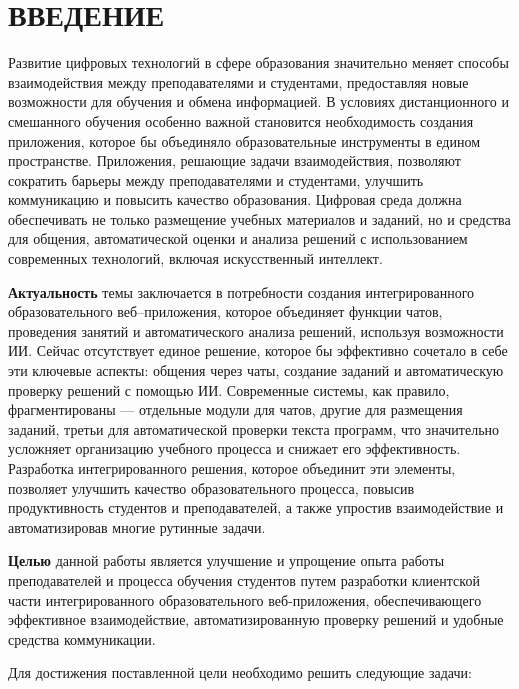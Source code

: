 \newpage
{}
\section*{ВВЕДЕНИЕ}

Развитие цифровых технологий в сфере образования значительно меняет способы взаимодействия между преподавателями и студентами, предоставляя новые возможности для обучения и обмена информацией. В условиях дистанционного и смешанного обучения особенно важной становится необходимость создания приложения, которое бы объединяло образовательные инструменты в едином пространстве. Приложения, решающие задачи взаимодействия, позволяют сократить барьеры между преподавателями и студентами, улучшить коммуникацию и повысить качество образования. Цифровая среда должна обеспечивать не только размещение учебных материалов и заданий, но и средства для общения, автоматической оценки и анализа решений с использованием современных технологий, включая искусственный интеллект.

\textbf{Актуальность} темы заключается в потребности создания интегрированного образовательного веб–приложения, которое объединяет функции чатов, проведения занятий и автоматического анализа решений, используя возможности ИИ. Сейчас отсутствует единое решение, которое бы эффективно сочетало в себе эти ключевые аспекты: общения через чаты, создание заданий и автоматическую проверку решений с помощью ИИ. Современные системы, как правило, фрагментированы — отдельные модули для чатов, другие для размещения заданий, третьи для автоматической проверки текста программ, что значительно усложняет организацию учебного процесса и снижает его эффективность. Разработка интегрированного решения, которое объединит эти элементы, позволяет улучшить качество образовательного процесса, повысив продуктивность студентов и преподавателей, а также упростив взаимодействие и автоматизировав многие рутинные задачи.

\textbf{Целью} данной работы является улучшение и упрощение опыта работы преподавателей и процесса обучения студентов путем разработки клиентской части интегрированного образовательного веб-приложения, обеспечивающего эффективное взаимодействие, автоматизированную проверку решений и удобные средства коммуникации.

Для достижения поставленной цели необходимо решить следующие задачи:

